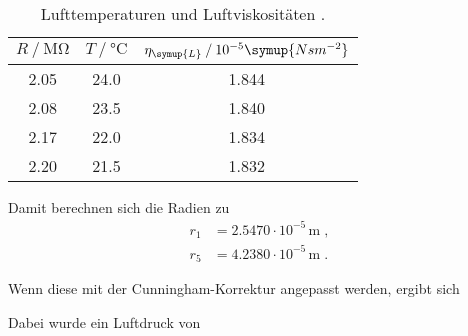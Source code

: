 \begin{table}
    \centering
    \caption{Lufttemperaturen und Luftviskositäten \cite{ap503}.}
\begin{tabular}{c c c}
    \toprule
        $R\mathbin{/}\unit{\mega\ohm}$ &$T\mathbin{/}\unit{\celsius}$ & $\eta_{\symup{L}}\mathbin{/}10^{-5}\symup{Nsm^{-2}}$ \\
    \midrule
    2.05 & 24.0 & 1.844 \\
    2.08 & 23.5 & 1.840\\
    2.17 & 22.0 & 1.834\\
    2.20 & 21.5 & 1.832\\
     \bottomrule
    \end{tabular}
    \label{tab:Viskositaet}
\end{table}

Damit berechnen sich die Radien zu
\begin{align*}
    r_1 &= 2.5470 \cdot 10^{-5} \,\unit{\m} \; ,\\
    r_5 &= 4.2380 \cdot 10^{-5} \,\unit{\m}\; .
\end{align*}

Wenn diese mit der Cunningham-Korrektur angepasst werden, ergibt sich


Dabei wurde ein Luftdruck von 